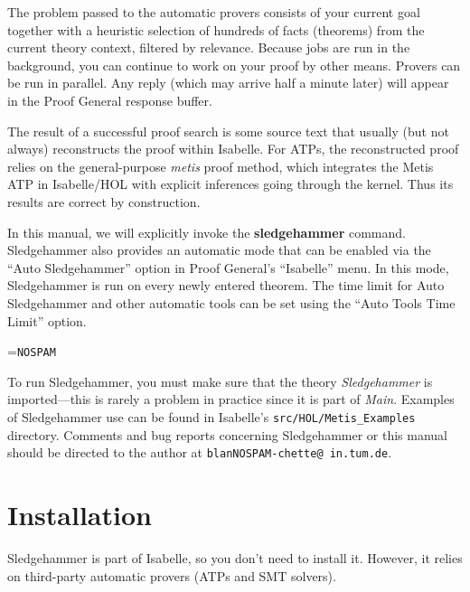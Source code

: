 \documentclass[a4paper,12pt]{article}
\begin{document}
The problem passed to the automatic provers consists of your current goal
together with a heuristic selection of hundreds of facts (theorems) from the
current theory context, filtered by relevance. Because jobs are run in the
background, you can continue to work on your proof by other means. Provers can
be run in parallel. Any reply (which may arrive half a minute later) will appear
in the Proof General response buffer.

The result of a successful proof search is some source text that usually (but
not always) reconstructs the proof within Isabelle. For ATPs, the reconstructed
proof relies on the general-purpose \textit{metis} proof method, which
integrates the Metis ATP in Isabelle/HOL with explicit inferences going through
the kernel. Thus its results are correct by construction.

In this manual, we will explicitly invoke the \textbf{sledgehammer} command.
Sledgehammer also provides an automatic mode that can be enabled via the ``Auto
Sledgehammer'' option in Proof General's ``Isabelle'' menu. In this mode,
Sledgehammer is run on every newly entered theorem. The time limit for Auto
Sledgehammer and other automatic tools can be set using the ``Auto Tools Time
Limit'' option.

\newbox\boxA
\setbox\boxA=\hbox{\texttt{NOSPAM}}

\newcommand\authoremail{\texttt{blan{\color{white}NOSPAM}\kern-\wd\boxA{}chette@\allowbreak
in.\allowbreak tum.\allowbreak de}}

To run Sledgehammer, you must make sure that the theory \textit{Sledgehammer} is
imported---this is rarely a problem in practice since it is part of
\textit{Main}. Examples of Sledgehammer use can be found in Isabelle's
\texttt{src/HOL/Metis\_Examples} directory.
Comments and bug reports concerning Sledgehammer or this manual should be
directed to the author at \authoremail.

\smallskipamount


\section{Installation}
\label{installation}

Sledgehammer is part of Isabelle, so you don't need to install it. However, it
relies on third-party automatic provers (ATPs and SMT solvers).
\end{document}
